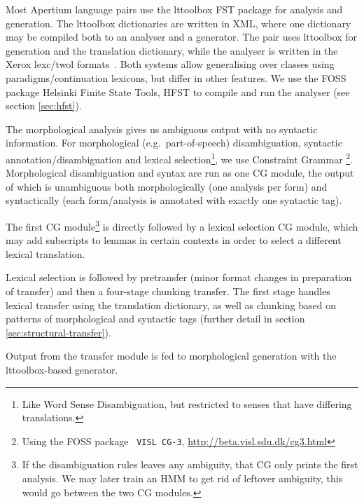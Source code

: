 Most Apertium language pairs use the lttoolbox FST package for
analysis and generation. The lttoolbox dictionaries are written in
XML, where one dictionary may be compiled both to an analyser and a
generator. The \smenob{} pair uses lttoolbox for \nob{} generation and
the translation dictionary, while the \sme{} analyser is written in the
Xerox lexc/twol formats~\citep{beesley2003fsm}. Both systems allow
generalising over classes using paradigms/continuation lexicons, but
differ in other features. We use the FOSS package Helsinki Finite
State Tools, HFST \citep{linden2011hfst} to compile and run the
analyser (see section \ref{sec:hfst}).

The morphological analysis gives us ambiguous output with no syntactic
information. For morphological (e.g.~part-of-speech) disambiguation,
syntactic annotation/disambiguation and lexical
selection\footnote{Like Word Sense Disambiguation, but restricted to
  senses that have differing translations.}, we use Constraint Grammar
\citep{karlsson1990cgf}\footnote{Using the FOSS package {\tt \small
    VISL CG-3},
  \href{http://beta.visl.sdu.dk/cg3.html}{http://beta.visl.sdu.dk/cg3.html}}.
Morphological disambiguation and syntax
are run as one CG module, the output of which is unambiguous both
morphologically (one analysis per form) and syntactically (each
form/analysis is annotated with exactly one syntactic tag).

The first CG module\footnote{If the disambiguation rules leaves any
  ambiguity, that CG only prints the first analysis. We may later
  train an HMM to get rid of leftover ambiguity, this would go between
  the two CG modules.} is directly followed by a lexical selection CG
module, which may add subscripts to lemmas in certain contexts in
order to select a different lexical translation.

Lexical selection is followed by pretransfer (minor format changes in
preparation of transfer) and then a four-stage chunking transfer. The
first stage handles lexical transfer using the translation dictionary,
as well as chunking based on patterns of morphological and syntactic
tags (further detail in section \ref{sec:structural-transfer}).

Output from the transfer module is fed to morphological generation
with the lttoolbox-based \nob{} generator.


